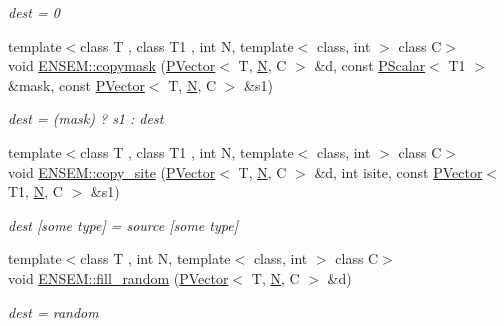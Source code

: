 \begin{DoxyCompactItemize}
\begin{DoxyCompactList}\small\item\em dest = 0 \end{DoxyCompactList}\item 
{\footnotesize template$<$class T , class T1 , int N, template$<$ class, int $>$ class C$>$ }\\void \mbox{\hyperlink{group__primvector_ga6018d56f682cba0fc157b7df0ac3b403}{E\+N\+S\+E\+M\+::copymask}} (\mbox{\hyperlink{classENSEM_1_1PVector}{P\+Vector}}$<$ T, \mbox{\hyperlink{operator__name__util_8cc_a7722c8ecbb62d99aee7ce68b1752f337}{N}}, C $>$ \&d, const \mbox{\hyperlink{classENSEM_1_1PScalar}{P\+Scalar}}$<$ T1 $>$ \&mask, const \mbox{\hyperlink{classENSEM_1_1PVector}{P\+Vector}}$<$ T, \mbox{\hyperlink{operator__name__util_8cc_a7722c8ecbb62d99aee7ce68b1752f337}{N}}, C $>$ \&s1)
\begin{DoxyCompactList}\small\item\em dest = (mask) ? s1 \+: dest \end{DoxyCompactList}\item 
{\footnotesize template$<$class T , class T1 , int N, template$<$ class, int $>$ class C$>$ }\\void \mbox{\hyperlink{group__primvector_ga7ec4d85cf781e6147a5e1b9ac46234e4}{E\+N\+S\+E\+M\+::copy\+\_\+site}} (\mbox{\hyperlink{classENSEM_1_1PVector}{P\+Vector}}$<$ T, \mbox{\hyperlink{operator__name__util_8cc_a7722c8ecbb62d99aee7ce68b1752f337}{N}}, C $>$ \&d, int isite, const \mbox{\hyperlink{classENSEM_1_1PVector}{P\+Vector}}$<$ T1, \mbox{\hyperlink{operator__name__util_8cc_a7722c8ecbb62d99aee7ce68b1752f337}{N}}, C $>$ \&s1)
\begin{DoxyCompactList}\small\item\em dest \mbox{[}some type\mbox{]} = source \mbox{[}some type\mbox{]} \end{DoxyCompactList}\item 
{\footnotesize template$<$class T , int N, template$<$ class, int $>$ class C$>$ }\\void \mbox{\hyperlink{group__primvector_ga3170048baaf649f10798f2d8e0b41c86}{E\+N\+S\+E\+M\+::fill\+\_\+random}} (\mbox{\hyperlink{classENSEM_1_1PVector}{P\+Vector}}$<$ T, \mbox{\hyperlink{operator__name__util_8cc_a7722c8ecbb62d99aee7ce68b1752f337}{N}}, C $>$ \&d)
\begin{DoxyCompactList}\small\item\em dest = random \end{DoxyCompactList}\item 

\end{DoxyCompactItemize}
